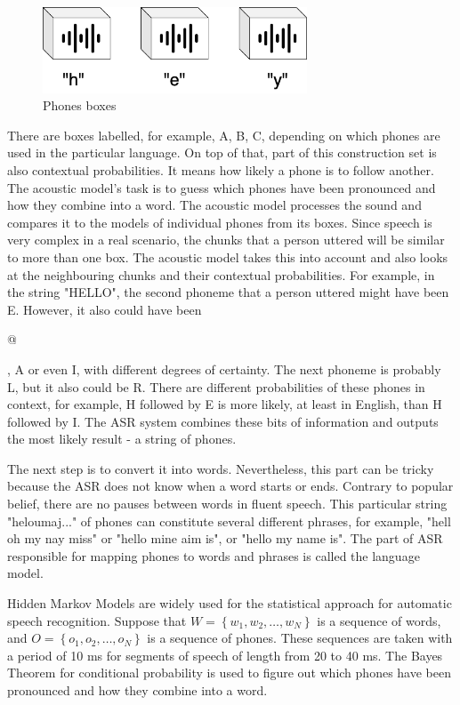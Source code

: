 \begin{figure}[H]
    \centering
    \includegraphics[width=0.7\textwidth]{img/phones_boxes.png}
    \caption{Phones boxes}
    \label{fig:phones_boxes}
\end{figure}

There are boxes labelled, for example, A, B, C, depending on which phones are used in the particular language. On top of that, part of this construction set is also contextual probabilities. It means how likely a phone is to follow another. The acoustic model's task is to guess which phones have been pronounced and how they combine into a word. The acoustic model processes the sound and compares it to the models of individual phones from its boxes. Since speech is very complex in a real scenario, the chunks that a person uttered will be similar to more than one box. The acoustic model takes this into account and also looks at the neighbouring chunks and their contextual probabilities. For example, in the string "HELLO", the second phoneme that a person uttered might have been E. However, it also could have been \begin{IPA}@\end{IPA}, A or even I, with different degrees of certainty. The next phoneme is probably L, but it also could be R. There are different probabilities of these phones in context, for example, H followed by E is more likely, at least in English, than H followed by I. The ASR system combines these bits of information and outputs the most likely result - a string of phones.\citep{stanislav_petr_2020}

The next step is to convert it into words. Nevertheless, this part can be tricky because the ASR does not know when a word starts or ends. Contrary to popular belief, there are no pauses between words in fluent speech. This particular string "heloumaj..." of phones can constitute several different phrases, for example, "hell oh my nay miss" or "hello mine aim is", or "hello my name is". The part of ASR responsible for mapping phones to words and phrases is called the language model.

Hidden Markov Models are widely used for the statistical approach for automatic speech recognition. Suppose that $W=\left\{w_{1}, w_{2}, \ldots, w_{N}\right\}$ is a sequence of words, and $O=\left\{o_{1}, o_{2}, \ldots, o_{N}\right\}$ is a sequence of phones. These sequences are taken with a period of 10 ms for segments of speech of length from 20 to 40 ms. The Bayes Theorem for conditional probability is used to figure out which phones have been pronounced and how they combine into a word.

